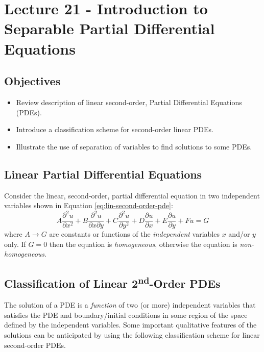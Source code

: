 \chapter{Lecture 21 - Introduction to Separable Partial Differential Equations}
\label{ch:lec21}
\section{Objectives}
\begin{itemize}
\item Review description of linear second-order, Partial Differential Equations (PDEs).
\item Introduce a classification scheme for second-order linear PDEs.
\item Illustrate the use of separation of variables to find solutions to some PDEs.
\end{itemize}

\section{Linear Partial Differential Equations}

Consider the linear, second-order, partial differential equation in two independent variables shown in Equation \ref{eq:lin-second-order-pde}:
\begin{equation}
A\frac{\partial^2u}{\partial x^2} + B\frac{\partial^2 u}{\partial x \partial y} + C\frac{\partial^2 u}{\partial y^2} + D \frac{\partial u}{\partial x} + E\frac{\partial u}{\partial y} + Fu = G
\label{eq:lin-second-order-pde}
\end{equation}
where $A\rightarrow G$ are constants or functions of the \emph{independent} variables $x$ and/or $y$ only.  If $G=0$ then the equation is \emph{homogeneous}, otherwise the equation is \emph{non-homogeneous}.

\section{Classification of Linear 2\textsuperscript{nd}-Order PDEs}
The solution of a PDE is a \emph{function} of two (or more) independent variables that satisfies the PDE and boundary/initial conditions in some region of the space defined by the independent variables.  Some important qualitative features of the solutions can be anticipated by using the following classification scheme for linear second-order PDEs.

